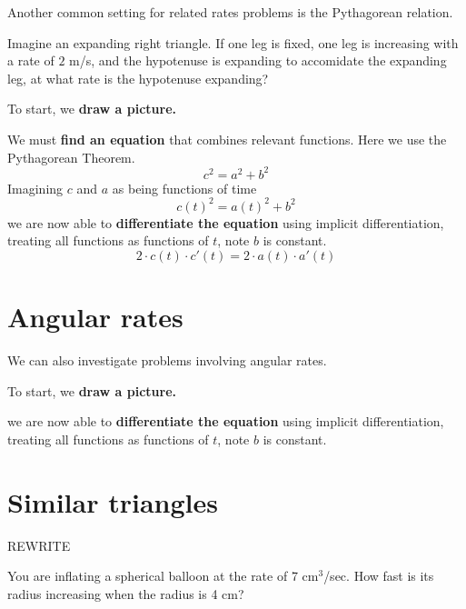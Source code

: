 \documentclass{ximera}
\begin{document}
Another common setting for related rates problems is the Pythagorean
relation.

\begin{example}
  Imagine an expanding right triangle. If one leg is fixed, one leg is
  increasing with a rate of $2$ m/s, and the hypotenuse is expanding
  to accomidate the expanding leg, at what rate is the hypotenuse
  expanding?
  \begin{explanation}
    To start, we \textbf{draw a picture.}


    We must \textbf{find an equation} that combines relevant
    functions. Here we use the Pythagorean Theorem.
    \[
    c^2 = a^2 + b^2
    \]
    Imagining $c$ and $a$ as being functions of time
    \[
    c(t)^2 = a(t)^2 + b^2
    \]
    we are now able to \textbf{differentiate the equation} using
    implicit differentiation, treating all functions as functions of
    $t$, note $b$ is constant.
    \[
    2\cdot c(t)\cdot c'(t) = 2\cdot a(t)\cdot a'(t)
    \]
  \end{explanation}
\end{example}




\section{Angular rates}


We can also investigate problems involving angular rates. 

\begin{example}
  
  \begin{explanation}
    To start, we \textbf{draw a picture.}

    we are now able to \textbf{differentiate the equation} using
    implicit differentiation, treating all functions as functions of
    $t$, note $b$ is constant.
  \end{explanation}
\end{example}


\section{Similar triangles}


REWRITE

\begin{example}
You are inflating a spherical balloon at the rate of 7 cm${}^3$/sec.  How
fast is its radius increasing when the radius is 4 cm?
\end{example}
\end{document}
